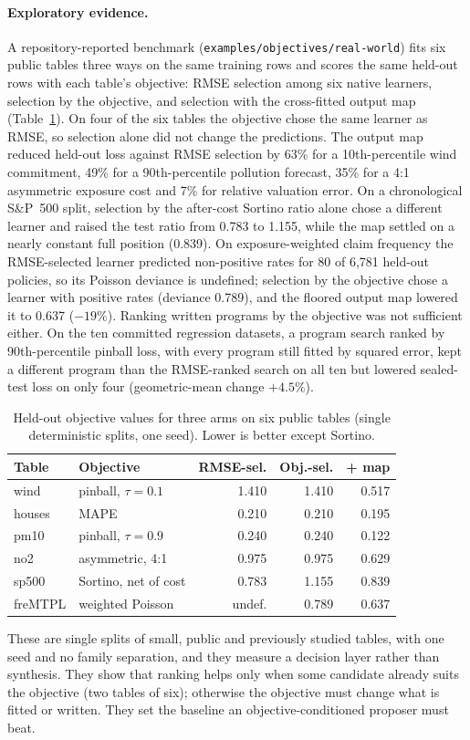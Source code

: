 \paragraph{Exploratory evidence.}
A repository-reported benchmark
(\nolinkurl{examples/objectives/real-world}) fits six public tables three ways
on the same training rows and scores the same held-out rows with each table's
objective: RMSE selection among six native learners, selection by the
objective, and selection with the cross-fitted output map
(Table~\ref{tab:objective-evidence}). On four of the six tables the
objective chose the same learner as RMSE, so selection alone did not change
the predictions. The output map reduced held-out loss against RMSE selection
by 63\% for a 10th-percentile wind commitment, 49\% for a 90th-percentile
pollution forecast, 35\% for a 4:1 asymmetric exposure cost and 7\% for
relative valuation error. On a chronological S\&P~500 split, selection by the
after-cost Sortino ratio alone chose a different learner and raised the test
ratio from 0.783 to 1.155, while the map settled on a nearly constant full
position (0.839). On exposure-weighted claim frequency the RMSE-selected
learner predicted non-positive rates for 80 of 6{,}781 held-out policies, so
its Poisson deviance is undefined; selection by the objective chose a learner
with positive rates (deviance 0.789), and the floored output map lowered it to
0.637 ($-19\%$). Ranking written programs by the objective was not
sufficient either. On the ten committed regression datasets, a program search
ranked by 90th-percentile pinball loss, with every program still fitted by
squared error, kept a different program than the RMSE-ranked search on all
ten but lowered sealed-test loss on only four (geometric-mean change
$+4.5\%$).
\begin{table}[t]
\centering
\small
\setlength{\tabcolsep}{4pt}
\caption{Held-out objective values for three arms on six public tables
(single deterministic splits, one seed). Lower is better except Sortino.}
\label{tab:objective-evidence}
\begin{tabular}{@{}llrrr@{}}
\toprule
Table & Objective & RMSE-sel. & Obj.-sel. & + map \\
\midrule
wind & pinball, $\tau=0.1$ & 1.410 & 1.410 & 0.517 \\
houses & MAPE & 0.210 & 0.210 & 0.195 \\
pm10 & pinball, $\tau=0.9$ & 0.240 & 0.240 & 0.122 \\
no2 & asymmetric, 4:1 & 0.975 & 0.975 & 0.629 \\
sp500 & Sortino, net of cost & 0.783 & 1.155 & 0.839 \\
freMTPL & weighted Poisson & undef. & 0.789 & 0.637 \\
\bottomrule
\end{tabular}
\end{table}
These are single splits of
small, public and previously studied tables, with one seed and no family
separation, and they measure a decision layer rather than synthesis. They
show that ranking helps only when some candidate already suits the objective
(two tables of six); otherwise the objective must change what is fitted or
written. They set the baseline an objective-conditioned proposer must beat.


